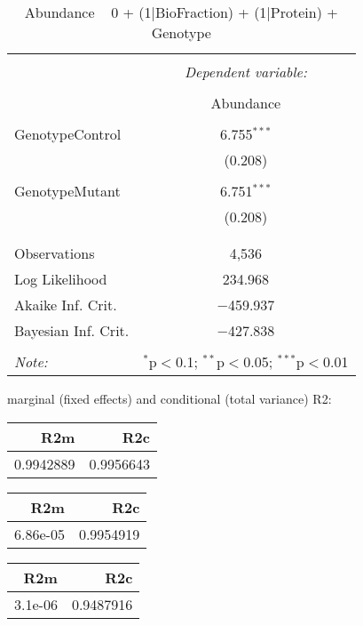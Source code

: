 \documentclass[11pt]{report}
\begin{document}
\begin{table}[!htbp] \centering 
  \caption{Abundance ~ 0 + (1|BioFraction) + (1|Protein) + Genotype} 
  \label{} 
\begin{tabular}{@{\extracolsep{5pt}}lc} 
\\[-1.8ex]\hline 
\hline \\[-1.8ex] 
 & \multicolumn{1}{c}{\textit{Dependent variable:}} \\ 
\cline{2-2} 
\\[-1.8ex] & Abundance \\ 
\hline \\[-1.8ex] 
 GenotypeControl & 6.755$^{***}$ \\ 
  & (0.208) \\ 
  & \\ 
 GenotypeMutant & 6.751$^{***}$ \\ 
  & (0.208) \\ 
  & \\ 
\hline \\[-1.8ex] 
Observations & 4,536 \\ 
Log Likelihood & 234.968 \\ 
Akaike Inf. Crit. & $-$459.937 \\ 
Bayesian Inf. Crit. & $-$427.838 \\ 
\hline 
\hline \\[-1.8ex] 
\textit{Note:}  & \multicolumn{1}{r}{$^{*}$p$<$0.1; $^{**}$p$<$0.05; $^{***}$p$<$0.01} \\ 
\end{tabular} 
\end{table} 
marginal (fixed effects) and conditional (total variance) R2:

\begin{tabular}{r|r}
\hline
R2m & R2c\\
\hline
0.9942889 & 0.9956643\\
\hline
\end{tabular}

\begin{tabular}{r|r}
\hline
R2m & R2c\\
\hline
6.86e-05 & 0.9954919\\
\hline
\end{tabular}

\begin{tabular}{r|r}
\hline
R2m & R2c\\
\hline
3.1e-06 & 0.9487916\\
\hline
\end{tabular}
\end{document}

